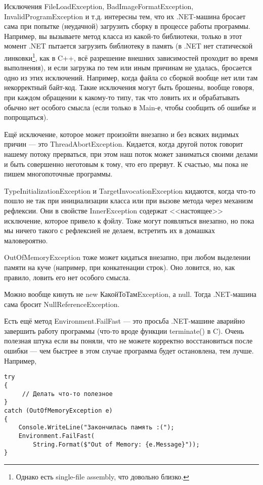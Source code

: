 \documentclass[a5paper]{article}
\begin{document}
Исключения FileLoadException, BadImageFormatException, InvalidProgramException и т.д. интересны тем, что их .NET-машина бросает сама при попытке (неудачной) загрузить сборку в процессе работы программы. Например, вы вызываете метод класса из какой-то библиотеки, только в этот момент .NET пытается загрузить библиотеку в память (в .NET нет статической линковки\footnote{Однако есть single-file assembly, что довольно близко.}, как в C++, всё разрешение внешних зависимостей проходит во время выполнения), и если загрузка по тем или иным причинам не удалась, бросается одно из этих исключений. Например, когда файла со сборкой вообще нет или там некорректный байт-код. Такие исключения могут быть брошены, вообще говоря, при каждом обращении к какому-то типу, так что ловить их и обрабатывать обычно нет особого смысла (если только в Main-е, чтобы сообщить об ошибке и попрощаться).

Ещё исключение, которое может произойти внезапно и без всяких видимых причин --- это ThreadAbortException. Кидается, когда другой поток говорит нашему потоку прерваться, при этом наш поток может заниматься своими делами и быть совершенно неготовым к тому, что его прервут. К счастью, мы пока не пишем многопоточные программы.

TypeInitializationException и TargetInvocationException кидаются, когда что-то пошло не так при инициализации класса или при вызове метода через механизм рефлексии. Они в свойстве InnerException содержат <<настоящее>> исключение, которое привело к фэйлу. Тоже могут появляться внезапно, но пока мы ничего такого с рефлексией не делаем, встретить их в домашках маловероятно.

OutOfMemoryException тоже может кидаться внезапно, при любом выделении памяти на куче (например, при конкатенации строк). Оно ловится, но, как правило, ловить его нет особого смысла.

Можно вообще кинуть не new КакойТоТамException, а null. Тогда .NET-машина сама бросит NullReferenceException.

Есть ещё метод Environment.FailFast --- это просьба .NET-машине аварийно завершить работу программы (что-то вроде функции terminate() в C). Очень полезная штука если вы поняли, что не можете корректно восстановиться после ошибки --- чем быстрее в этом случае программа будет остановлена, тем лучше. Например,

\begin{verbatim}
try 
{
     // Делать что-то полезное
}
catch (OutOfMemoryException e) 
{
    Console.WriteLine("Закончилась память :(");
    Environment.FailFast(
        String.Format($"Out of Memory: {e.Message}"));
}
\end{verbatim}
\end{document}
